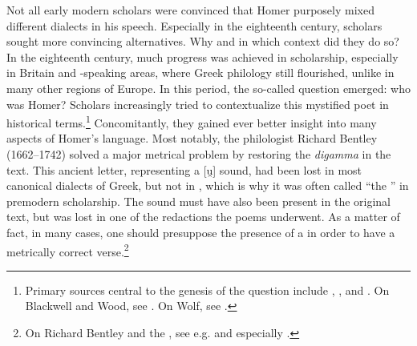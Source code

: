 Not all early modern scholars were convinced that Homer purposely mixed different dialects in his speech. Especially in the eighteenth century, scholars sought more convincing alternatives. Why and in which context did they do so? In the eighteenth century, much progress was achieved in  scholarship, especially in Britain and -speaking areas, where Greek philology still flourished, unlike in many other regions of Europe. In this period, the so-called  question emerged: who was Homer? Scholars increasingly tried to contextualize this mystified poet in historical terms.\footnote{Primary sources central to the genesis of the  question include \citet[]{[blackwell]1735}, \citet{Wood1775}, and \citet{Wolf1795}. On Blackwell and Wood, see \citet[90--108]{Bauman2003}. On Wolf, see \citet[55–57]{Sandys_history_1908-1}.} Concomitantly, they gained ever better insight into many aspects of Homer’s language. Most notably, the  philologist Richard Bentley (1662–1742) solved a major metrical problem by restoring the \textit{digamma} in the  text. This ancient letter, representing a [u̯] sound, had been lost in most canonical dialects of Greek, but not in , which is why it was often called “the  ” in premodern scholarship. The sound must have also been present in the original  text, but was lost in one of the redactions the poems underwent. As a matter of fact, in many cases, one should presuppose the presence of a  in order to have a metrically correct verse.\footnote{On Richard Bentley and the , see e.g. \citet[407]{Sandys1908} and especially \citet[182--186]{Haugen2011}.}

